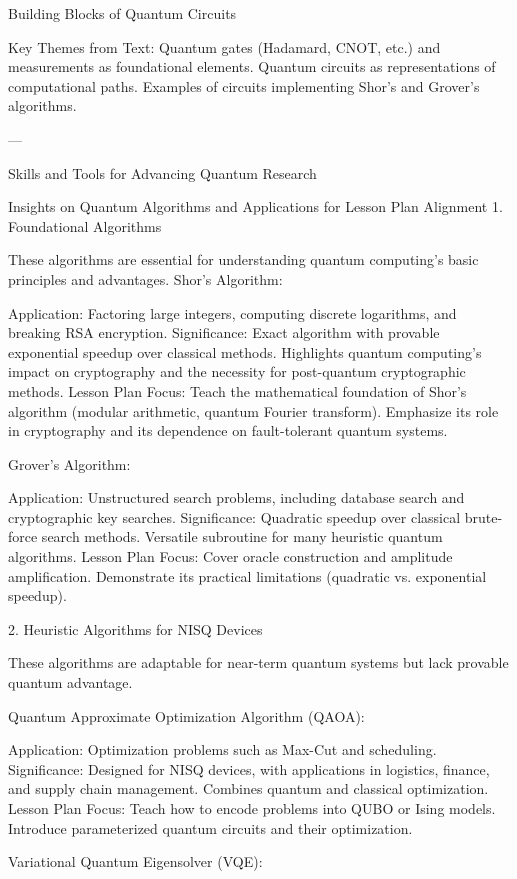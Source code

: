 Building Blocks of Quantum Circuits

Key Themes from Text:
Quantum gates (Hadamard, CNOT, etc.) and measurements as foundational elements.
Quantum circuits as representations of computational paths.
Examples of circuits implementing Shor’s and Grover’s algorithms.


---

Skills and Tools for Advancing Quantum Research



Insights on Quantum Algorithms and Applications for Lesson Plan Alignment
1. Foundational Algorithms

These algorithms are essential for understanding quantum computing's basic principles and advantages.
Shor’s Algorithm:

Application: Factoring large integers, computing discrete logarithms, and breaking RSA encryption.
Significance:
Exact algorithm with provable exponential speedup over classical methods.
Highlights quantum computing’s impact on cryptography and the necessity for post-quantum cryptographic methods.
Lesson Plan Focus:
Teach the mathematical foundation of Shor’s algorithm (modular arithmetic, quantum Fourier transform).
Emphasize its role in cryptography and its dependence on fault-tolerant quantum systems.

Grover’s Algorithm:

Application: Unstructured search problems, including database search and cryptographic key searches.
Significance:
Quadratic speedup over classical brute-force search methods.
Versatile subroutine for many heuristic quantum algorithms.
Lesson Plan Focus:
Cover oracle construction and amplitude amplification.
Demonstrate its practical limitations (quadratic vs. exponential speedup).

2. Heuristic Algorithms for NISQ Devices

These algorithms are adaptable for near-term quantum systems but lack provable quantum advantage.

Quantum Approximate Optimization Algorithm (QAOA):

Application: Optimization problems such as Max-Cut and scheduling.
Significance:
Designed for NISQ devices, with applications in logistics, finance, and supply chain management.
Combines quantum and classical optimization.
Lesson Plan Focus:
Teach how to encode problems into QUBO or Ising models.
Introduce parameterized quantum circuits and their optimization.

Variational Quantum Eigensolver (VQE):

